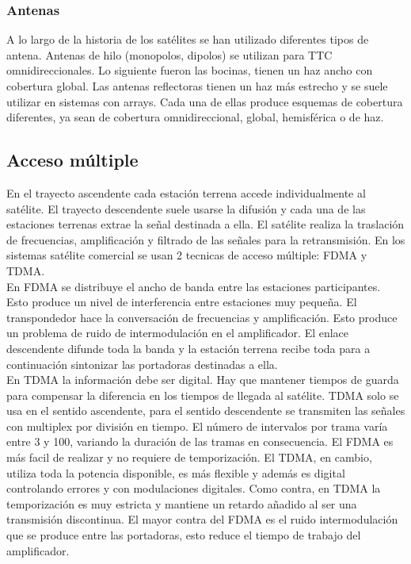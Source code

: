 		\subsubsection{Antenas}
		\label{ssub:antenas}
		A lo largo de la historia de los satélites se han utilizado diferentes tipos de antena. Antenas de hilo (monopolos, dipolos) se utilizan para TTC omnidireccionales. Lo siguiente fueron las bocinas, tienen un haz ancho con cobertura global. Las antenas reflectoras tienen un haz más estrecho y se suele utilizar en sistemas con arrays. Cada una de ellas produce esquemas de cobertura diferentes, ya sean de cobertura omnidireccional, global, hemisférica o de haz.
	\subsection{Acceso múltiple}
	\label{sub:satAccesoMultiple}
		En el trayecto ascendente cada estación terrena accede individualmente al satélite. El trayecto descendente suele usarse la difusión y cada una de las estaciones terrenas extrae la señal destinada a ella. El satélite realiza la traslación de frecuencias, amplificación y filtrado de las señales para la retransmisión. En los sistemas satélite comercial se usan 2 tecnicas de acceso múltiple: FDMA y TDMA.\\
		En FDMA se distribuye el ancho de banda entre las estaciones participantes. Esto produce un nivel de interferencia entre estaciones muy pequeña. El transpondedor hace la conversación de frecuencias y amplificación. Esto produce un problema de ruido de intermodulación en el amplificador. El enlace descendente difunde toda la banda y la estación terrena recibe toda para a continuación sintonizar las portadoras destinadas a ella.\\
		En TDMA la información debe ser digital. Hay que mantener tiempos de guarda para compensar la diferencia en los tiempos de llegada al satélite. TDMA solo se usa en el sentido ascendente, para el sentido descendente se transmiten las señales con multiplex por división en tiempo. El número de intervalos por trama varía entre 3 y 100, variando la duración de las tramas en consecuencia.
		El FDMA es más facil de realizar y no requiere de temporización. El TDMA, en cambio, utiliza toda la potencia disponible, es más flexible y además es digital controlando errores y con modulaciones digitales. Como contra, en TDMA la temporización es muy estricta y mantiene un retardo añadido al ser una transmisión discontinua. El mayor contra del FDMA es el ruido intermodulación que se produce entre las portadoras, esto reduce el tiempo de trabajo del amplificador.
